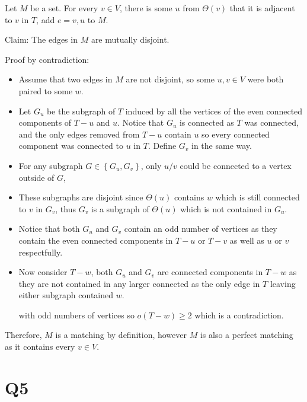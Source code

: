 \documentclass[a4paper, 11pt]{article}
\def\set#1{\left\{ #1 \right\}}
\begin{document}
\begin{multicols*}{2}
\begin{mdframed}
		Let $M$ be a set. For every $v\in V$, there is some $u$ from $\Theta(v)$ that it is adjacent to $v$ in $T$, add $e={v,u}$ to $M$.

		Claim: The edges in $M$ are mutually disjoint.

		Proof by contradiction:
		\begin{itemize}
			\item 	Assume that two edges in $M$ are not disjoint, so some $u,v\in V$ were both paired to some $w$.

			\item Let $G_u$ be the subgraph of $T$ induced by all the vertices of the even connected components of $T-u$ and $u$. Notice that $G_u$ is connected as $T$ was connected, and the only edges removed from $T-u$ contain $u$ so every connected component was connected to $u$ in $T$. Define $G_v$ in the same way.

			\item For any subgraph $G\in\set{G_u,G_v}$, only $u/v$ could be connected to a vertex outside of $G$,

			\item These subgraphs are disjoint since $\Theta(u)$ contains $w$ which is still connected to $v$ in $G_v$, thus $G_v$ is a subgraph of $\Theta(u)$ which is not contained in $G_u$.

			\item Notice that both $G_u$ and $G_v$ contain an odd number of vertices as they contain the even connected components in $T-u$ or $T-v$ as well as $u$ or $v$ respectfully.

			\item Now consider $T-w$, both $G_u$ and $G_v$ are connected components in $T-w$ as they are not contained in any larger connected as the only edge in $T$ leaving either subgraph contained $w$.


			      with odd numbers of vertices so $o(T-w)\geq 2$ which is a contradiction.
		\end{itemize}

		Therefore, $M$ is a matching by definition, however $M$ is also a perfect matching as it contains every $v\in V$.
	\end{mdframed}





	\section*{Q5}


\end{multicols*}
\end{document}
